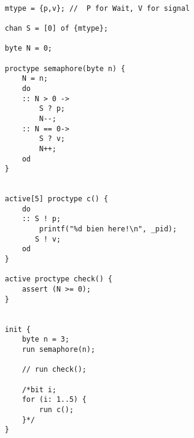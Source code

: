 \begin{lstlisting}[language=Promela]

mtype = {p,v}; //  P for Wait, V for signal

chan S = [0] of {mtype};

byte N = 0;

proctype semaphore(byte n) {
    N = n;
    do
    :: N > 0 ->
        S ? p;
        N--;
    :: N == 0->
        S ? v;
        N++;
    od
}


active[5] proctype c() {
    do 
    :: S ! p;
        printf("%d bien here!\n", _pid);
       S ! v;
    od
}

active proctype check() {
    assert (N >= 0);
}


init {
    byte n = 3;
    run semaphore(n);

    // run check();

    /*bit i;
    for (i: 1..5) {
        run c();
    }*/ 
}


\end{lstlisting}
